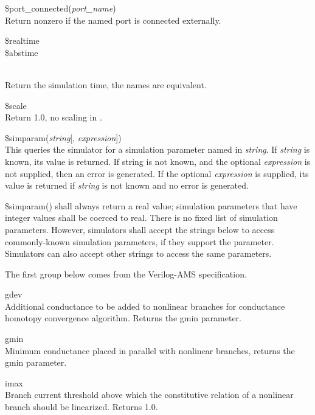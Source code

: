 \begin{description}
\item{\vt \$port\_connected}({\it port\_name\/})\\
Return nonzero if the named port is connected externally.

\item{\parbox{4in}{
{\vt \$realtime}\\
{\vt \$abstime}}}\\
Return the simulation time, the names are equivalent.

\item{\vt \$scale}\\
Return 1.0, no scaling in {\WRspice}.

\item{\vt \$simparam}({\it string\/}[, {\it expression\/}])\\ This
queries the simulator for a simulation parameter named in {\it
string\/}.  If {\it string} is known, its value is returned.  If
string is not known, and the optional {\it expression} is not
supplied, then an error is generated.  If the optional {\it
expression} is supplied, its value is returned if {\it string} is not
known and no error is generated. 

{\vt \$simparam}() shall always return a real value; simulation
parameters that have integer values shall be coerced to real.  There
is no fixed list of simulation parameters.  However, simulators shall
accept the strings below to access commonly-known simulation
parameters, if they support the parameter.  Simulators can also accept
other strings to access the same parameters.

The first group below comes from the Verilog-AMS specification.

\begin{description}
\item{\vt gdev}\\
Additional conductance to be added to nonlinear branches for
conductance homotopy convergence algorithm.  Returns the {\WRspice}
{\vt gmin} parameter.

\item{\vt gmin}\\
Minimum conductance placed in parallel with nonlinear branches,
returns the {\WRspice} {\vt gmin} parameter.

\item{\vt imax}\\
Branch current threshold above which the constitutive relation
of a nonlinear branch should be linearized.  Returns 1.0.


\end{description}
\end{description}
